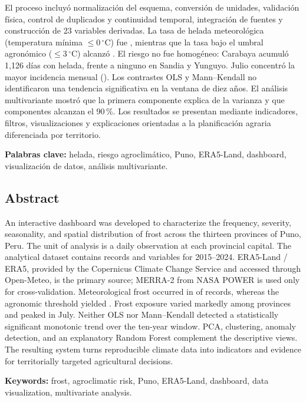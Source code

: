 \documentclass[11pt,a4paper]{article}
\begin{document}
El proceso incluyó normalización del esquema, conversión de unidades, validación física,
control de duplicados y continuidad temporal, integración de fuentes y construcción de 23
variables derivadas. La tasa de helada meteorológica (temperatura mínima $\leq 0\,^{\circ}\mathrm{C}$)
fue \TasaHelada{}, mientras que la tasa bajo el umbral agronómico ($\leq 3\,^{\circ}\mathrm{C}$)
alcanzó \TasaHeladaAgronomica{}. El riesgo no fue homogéneo: Carabaya acumuló 1,126 días
con helada, frente a ninguno en Sandia y Yunguyo. Julio concentró la mayor incidencia
mensual (\TasaJulio{}). Los contrastes OLS y Mann--Kendall no identificaron una tendencia
significativa en la ventana de diez años. El análisis multivariante mostró que la primera
componente explica \PCAUno{} de la varianza y que \PCANoventa{} componentes alcanzan el
90\,\%. Los resultados se presentan mediante indicadores, filtros, visualizaciones y
explicaciones orientadas a la planificación agraria diferenciada por territorio.

\noindent\textbf{Palabras clave:} helada, riesgo agroclimático, Puno, ERA5-Land, dashboard,
visualización de datos, análisis multivariante.

\subsection*{Abstract}

An interactive dashboard was developed to characterize the frequency, severity,
seasonality, and spatial distribution of frost across the thirteen provinces of Puno,
Peru. The unit of analysis is a daily observation at each provincial capital. The
analytical dataset contains \NRegistros{} records and \NVariables{} variables for
2015--2024. ERA5-Land / ERA5, provided by the Copernicus Climate Change Service and
accessed through Open-Meteo, is the primary source; MERRA-2 from NASA POWER is used only
for cross-validation. Meteorological frost occurred in \TasaHelada{} of records, whereas
the agronomic threshold yielded \TasaHeladaAgronomica{}. Frost exposure varied markedly
among provinces and peaked in July. Neither OLS nor Mann--Kendall detected a statistically
significant monotonic trend over the ten-year window. PCA, clustering, anomaly detection,
and an explanatory Random Forest complement the descriptive views. The resulting system
turns reproducible climate data into indicators and evidence for territorially targeted
agricultural decisions.

\noindent\textbf{Keywords:} frost, agroclimatic risk, Puno, ERA5-Land, dashboard, data
visualization, multivariate analysis.
\end{document}
